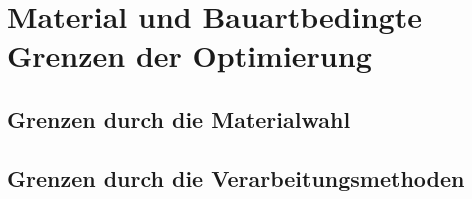 \chapter{Material und Bauartbedingte Grenzen der Optimierung}\label{cha:Material- und Bauartbedingte Grenzen der Optimierung}

\section{Grenzen durch die Materialwahl}

\section{Grenzen durch die Verarbeitungsmethoden}